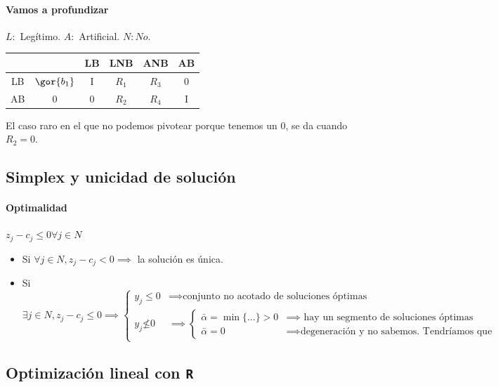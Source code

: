 \paragraph{Vamos a profundizar}
$L:$ Legítimo.
$A:$ Artificial.
$N: No$.
\begin{table}[hbtp]
\centering
\begin{tabular}{c||ccccc}
&&LB&LNB&ANB&AB\\\hline\hline
LB&$\gor{b_1}$&I&$R_1$&$R_3$&0\\
AB&0&0&$R_2$&$R_4$&I
\end{tabular}
\end{table}

El caso raro en el que no podemos pivotear porque tenemos un $0$, se da cuando $R_2 = 0$.

\subsection{Simplex y unicidad de solución}

\paragraph{Optimalidad} $z_j - c_j ≤ 0 ∀j∈N$

\begin{itemize}
	\item Si $∀j∈N, z_j - c_j < 0 \implies$ la solución es única.
	\item Si
		\[∃j∈N, z_j - c_j ≤ 0 \implies
			\left\{
				\begin{array}{cc}
					y_j ≤ 0 & \implies \text{conjunto no acotado de soluciones óptimas}\\
					y_j\not ≤0 &\implies
						\left\{
							\begin{array}{cc}
								\bar{α} = \min\{...\} > 0 &\implies \text{ hay un segmento de soluciones óptimas}\\
								\bar{α} = 0 &\implies  \text{degeneración y no sabemos. Tendríamos que pivotear y ver qué pasa}
							\end{array}
						\right.
				\end{array}
			\right.
		\]
\end{itemize}


\subsection{Optimización lineal con {\tt R}}

